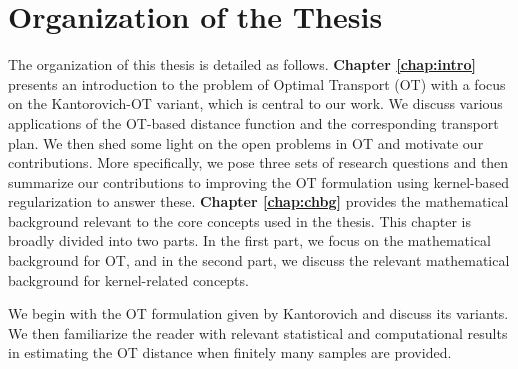 \section{Organization of the Thesis}
The organization of this thesis is detailed as follows.\newline\newline
\noindent\textbf{Chapter \ref{chap:intro}} presents an introduction to the problem of Optimal Transport (OT) with a focus on the Kantorovich-OT variant, which is central to our work. We discuss various applications of the OT-based distance function and the corresponding transport plan. We then shed some light on the open problems in OT and motivate our contributions. More specifically, we pose three sets of research questions and then summarize our contributions to improving the OT formulation using kernel-based regularization to answer these.
\newline
\newline
\noindent\textbf{Chapter \ref{chap:chbg}} provides the mathematical background relevant to the core concepts used in the thesis. This chapter is broadly divided into two parts. In the first part, we focus on the mathematical background for OT, and in the second part, we discuss the relevant mathematical background for kernel-related concepts. 

We begin with the OT formulation given by Kantorovich and discuss its variants. We then familiarize the reader with relevant statistical and computational results in estimating the OT distance when finitely many samples are provided.

